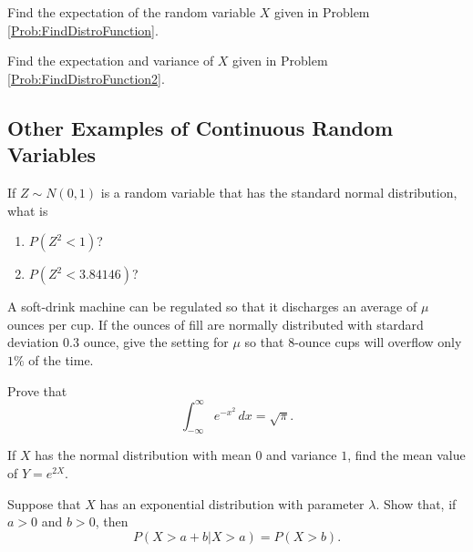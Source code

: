 \begin{problem}
Find the expectation of the random variable $X$ given in Problem \ref{Prob:FindDistroFunction}.
\end{problem}

\begin{problem}
Find the expectation and variance of $X$ given in Problem \ref{Prob:FindDistroFunction2}.
\end{problem}

\subsection{Other Examples of Continuous Random Variables}

\begin{problem}
If $Z \sim N (0, 1)$ is a random variable that has the standard normal distribution, what is
    \begin{enumerate}[label=\alph*)]
        \item $P (Z^2 < 1 )$?
        \item $P (Z^2 < 3.84146)$?
    \end{enumerate}
\end{problem}

\begin{problem}
A soft-drink machine can be regulated so that it discharges an average of $\mu$ ounces per cup. If the ounces of fill are normally distributed with stardard deviation $0.3$ ounce, give the setting for $\mu$ so that $8$-ounce cups will overflow only $1\%$ of the time.
\end{problem}

\begin{problem}
Prove that
    \[
        \int_{-\infty}^\infty e^{-x^2} \, dx = \sqrt{\pi} .
    \]
\end{problem}

\begin{problem}
If $X$ has the normal distribution with mean $0$ and variance $1$, find the mean value of $Y = e^{2X}$.
\end{problem}

\begin{problem}
Suppose that $X$ has an exponential distribution with parameter $\lambda$. Show that, if $a > 0$ and $b > 0$, then
    \[
        P (X > a + b | X > a) = P (X > b) .
    \]
\end{problem}




